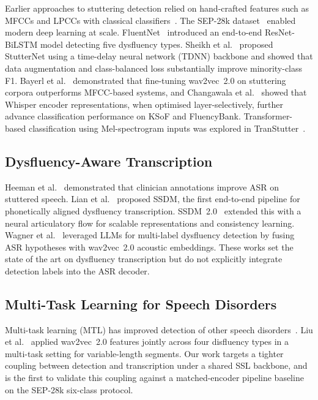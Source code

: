\documentclass[cameraready]{Interspeech}
\begin{document}
Earlier approaches to stuttering detection relied on hand-crafted features such
as MFCCs and LPCCs with classical classifiers~\cite{sheikh2021stutternet}. The
SEP-28k dataset~\cite{lea2021sep28k} enabled modern deep learning at scale.
FluentNet~\cite{kourkounakis2021fluentnet} introduced an end-to-end
ResNet-BiLSTM model detecting five dysfluency types. Sheikh
et al.~\cite{sheikh2023advancing} proposed StutterNet using a time-delay neural
network (TDNN) backbone and showed that data augmentation and class-balanced
loss substantially improve minority-class F1. Bayerl
et al.~\cite{bayerl2022detecting} demonstrated that fine-tuning wav2vec~2.0 on
stuttering corpora outperforms MFCC-based systems, and Changawala
et al.~\cite{changawala2024whister} showed that Whisper encoder representations,
when optimised layer-selectively, further advance classification performance on
KSoF and FluencyBank. Transformer-based classification using Mel-spectrogram
inputs was explored in TranStutter~\cite{basak2023transtutter}.

\subsection{Dysfluency-Aware Transcription}

Heeman et al.~\cite{heeman2016clinician} demonstrated that clinician annotations
improve ASR on stuttered speech. Lian et al.~\cite{lian2024ssdm} proposed SSDM,
the first end-to-end pipeline for phonetically aligned dysfluency transcription.
SSDM~2.0~\cite{lian2025ssdm2} extended this with a neural articulatory flow for
scalable representations and consistency learning. Wagner
et al.~\cite{wagner2024llm} leveraged LLMs for multi-label dysfluency detection
by fusing ASR hypotheses with wav2vec~2.0 acoustic embeddings. These works set
the state of the art on dysfluency transcription but do not explicitly integrate
detection labels into the ASR decoder.

\subsection{Multi-Task Learning for Speech Disorders}

Multi-task learning (MTL) has improved detection of other speech
disorders~\cite{bayerl2022detecting}. Liu et al.~\cite{liu2023wav2vec} applied
wav2vec~2.0 features jointly across four disfluency types in a multi-task
setting for variable-length segments. Our work targets a tighter coupling
between detection and transcription under a shared SSL backbone, and is the
first to validate this coupling against a matched-encoder pipeline baseline
on the SEP-28k six-class protocol.
\end{document}
